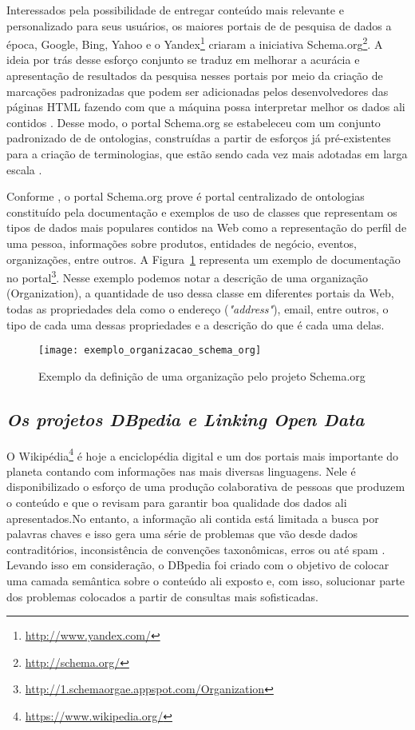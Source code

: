 Interessados pela possibilidade de entregar conteúdo mais relevante e personalizado para seus usuários, os maiores portais de de pesquisa de dados a época, Google, Bing, Yahoo e o Yandex\footnote{\url{http://www.yandex.com/}} criaram a iniciativa Schema.org\footnote{\url{http://schema.org/}}. A ideia por trás desse esforço conjunto se traduz em melhorar a acurácia e apresentação de resultados da pesquisa nesses portais por meio da criação de marcações padronizadas que podem ser adicionadas pelos desenvolvedores das páginas HTML fazendo com que a máquina possa interpretar melhor os dados ali contidos \citep{Tort2014, Mika2015}. Desse modo, o portal Schema.org se estabeleceu com um conjunto padronizado de de ontologias, construídas a partir de esforços já pré-existentes para a criação de terminologias, que estão sendo cada vez mais adotadas em larga escala \citep{Mika2015}.

Conforme \citet{Mika2015}, o portal Schema.org prove é portal centralizado de ontologias constituído pela documentação e exemplos de uso de classes que representam os tipos de dados mais populares contidos na Web como a representação do perfil de uma pessoa, informações sobre produtos, entidades de negócio, eventos, organizações, entre outros. A Figura~\ref{fig:exemplo_organizacao_schema_org} representa um exemplo de documentação no portal\footnote{\url{http://1.schemaorgae.appspot.com/Organization}}. Nesse exemplo podemos notar a descrição de uma organização (Organization), a quantidade de uso dessa classe em diferentes portais da Web, todas as propriedades dela como o endereço (\emph{"address"}), email, entre outros, o tipo de cada uma dessas propriedades e a descrição do que é cada uma delas.

\begin{figure}[!ht]
  \centering
  \texttt{[image: exemplo\_organizacao\_schema\_org]} 
  \caption{Exemplo da definição de uma organização pelo projeto Schema.org}
  \label{fig:exemplo_organizacao_schema_org} 
\end{figure}

\subsection{\emph{Os projetos DBpedia e Linking Open Data}}
\label{sec:projeto_dbpedia}

O Wikipédia\footnote{\url{https://www.wikipedia.org/}} é hoje a enciclopédia digital e um dos portais mais importante do planeta contando com informações nas mais diversas linguagens. Nele é disponibilizado o esforço de uma produção colaborativa de pessoas que produzem o conteúdo e que o revisam para garantir boa qualidade dos dados ali apresentados.No entanto, a informação ali contida está limitada a busca por palavras chaves e isso gera uma série de problemas que vão desde dados contraditórios, inconsistência de convenções taxonômicas, erros ou até spam \citep{Auer2007}. Levando isso em consideração, o DBpedia foi criado com o objetivo de colocar uma camada semântica sobre o conteúdo ali exposto e, com isso, solucionar parte dos problemas colocados a partir de consultas mais sofisticadas.

